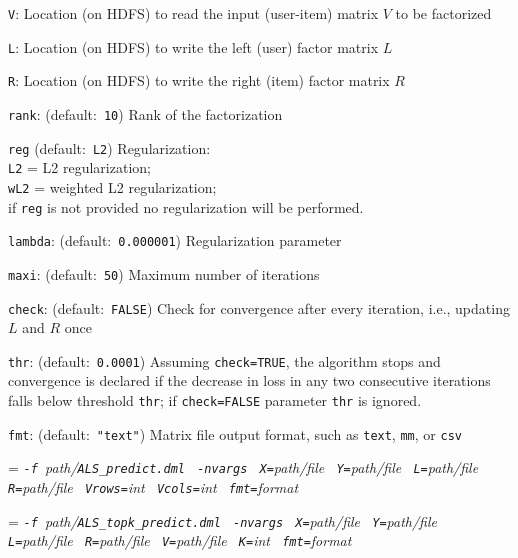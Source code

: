 \smallskip
{}
\begin{Description}
	\item[{\tt V}:]
	Location (on HDFS) to read the input (user-item) matrix $V$ to be factorized
	\item[{\tt L}:]
	Location (on HDFS) to write the left (user) factor matrix $L$
	\item[{\tt R}:]
	Location (on HDFS) to write the right (item) factor matrix $R$
	\item[{\tt rank}:] (default:\mbox{ }{\tt 10})
	Rank of the factorization
	\item[{\tt reg}] (default:\mbox{ }{\tt L2})
	Regularization:\\
	{\tt L2} = L2 regularization;\\
 	{\tt wL2} = weighted L2 regularization;\\
 	if {\tt reg} is not provided no regularization will be performed. 
 	\item[{\tt lambda}:] (default:\mbox{ }{\tt 0.000001})
 	Regularization parameter
 	\item[{\tt maxi}:] (default:\mbox{ }{\tt 50})
	 Maximum number of iterations
	\item[{\tt check}:] (default:\mbox{ }{\tt FALSE})
	Check for convergence after every iteration, i.e., updating $L$ and $R$ once
	\item[{\tt thr}:] (default:\mbox{ }{\tt 0.0001})
	Assuming {\tt check=TRUE}, the algorithm stops and convergence is declared 
	if the decrease in loss in any two consecutive iterations falls below threshold {\tt thr}; 
	if {\tt check=FALSE} parameter {\tt thr} is ignored.
	\item[{\tt fmt}:] (default:\mbox{ }{\tt "text"})
	Matrix file output format, such as {\tt text}, {\tt mm}, or {\tt csv}
\end{Description}
 
 \smallskip
 \smallskip
 
 {\hangindent=\parindent\noindent\it%
 	{\tt{}-f }path/\/{\tt{}ALS\_predict.dml}
 	{\tt{} -nvargs}
 	{\tt{} X=}path/file
 	{\tt{} Y=}path/file
 	{\tt{} L=}path/file
 	{\tt{} R=}path/file
 	{\tt{} Vrows=}int
 	{\tt{} Vcols=}int
 	{\tt{} fmt=}format
 	
 }\smallskip
 
 
  \smallskip  
  {\hangindent=\parindent\noindent\it%
  	{\tt{}-f }path/\/{\tt{}ALS\_topk\_predict.dml}
  	{\tt{} -nvargs}
  	{\tt{} X=}path/file
  	{\tt{} Y=}path/file
  	{\tt{} L=}path/file
  	{\tt{} R=}path/file
  	{\tt{} V=}path/file
  	{\tt{} K=}int
  	{\tt{} fmt=}format
  	
  }\smallskip
 
